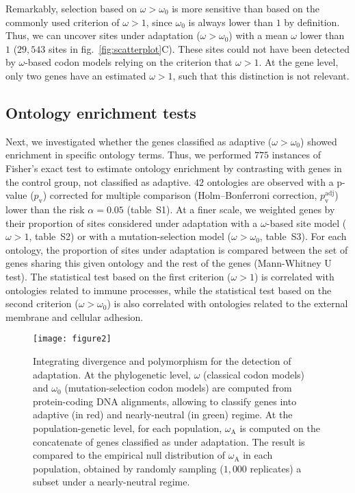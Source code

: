 \documentclass[9pt,twocolumn,twoside,lineno]{pnas-new}
\newcommand{\rateApop}{\omega_{\mathrm{A}}}
\begin{document}
Remarkably, selection based on $\omega>\omega_{0}$ is more sensitive than based on the commonly used criterion of $\omega>1$, since $\omega_{0}$ is always lower than $1$ by definition\cite{spielman_relationship_2015}.
Thus, we can uncover sites under adaptation ($\omega>\omega_{0}$) with a mean $\omega$ lower than $1$ ($29,543$ sites in fig.~\ref{fig:scatterplot}C).
These sites could not have been detected by $\omega$-based codon models relying on the criterion that $\omega>1$.
At the gene level, only two genes have an estimated $\omega > 1$, such that this distinction is not relevant.

\subsection*{Ontology enrichment tests}
Next, we investigated whether the genes classified as adaptive ($\omega > \omega_{0}$) showed enrichment in specific ontology terms.
Thus, we performed $775$ instances of Fisher's exact test to estimate ontology enrichment by contrasting with genes in the control group, not classified as adaptive.
$42$ ontologies are observed with a p-value ($p_{\mathrm{v}}$) corrected for multiple comparison (Holm–Bonferroni correction, $p_{\mathrm{v}}^{\mathrm{adj}}$) lower than the risk $\alpha=0.05$ (table~S1).
At a finer scale, we weighted genes by their proportion of sites considered under adaptation with a $\omega$-based site model ($\omega > 1$, table~S2) or with a mutation-selection model ($\omega > \omega_{0}$, table~S3).
For each ontology, the proportion of sites under adaptation is compared between the set of genes sharing this given ontology and the rest of the genes (Mann-Whitney U test).
The statistical test based on the first criterion ($\omega>1$) is correlated with ontologies related to immune processes, while the statistical test based on the second criterion ($\omega > \omega_{0}$) is also correlated with ontologies related to the external membrane and cellular adhesion.

\begin{figure*}[t]
       \centering
       \texttt{[image: figure2]}
       \caption{
              Integrating divergence and polymorphism for the detection of adaptation.
              At the phylogenetic level, $\omega$ (classical codon models) and $\omega_{0}$ (mutation-selection codon models) are computed from protein-coding DNA alignments, allowing to classify genes into adaptive (in red) and nearly-neutral (in green) regime.
              At the population-genetic level, for each population, $\rateApop$ is computed on the concatenate of genes classified as under adaptation.
              The result is compared to the empirical null distribution of $\rateApop$ in each population, obtained by randomly sampling ($1,000$ replicates) a subset under a nearly-neutral regime.
       }
       \label{fig:method}
\end{figure*}
\end{document}

